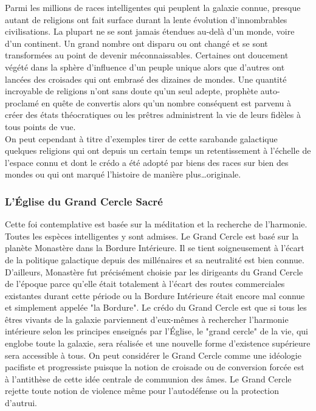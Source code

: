 \documentclass[twoside]{article}
\begin{document}
Parmi les millions de races intelligentes qui peuplent la galaxie connue, presque autant de religions ont fait surface durant la lente évolution d'innombrables civilisations. La plupart ne se sont jamais étendues au-delà d'un monde, voire d'un continent. Un grand nombre ont disparu ou ont changé et se sont transformées au point de devenir méconnaissables. Certaines ont doucement végété dans la sphère d'influence d'un peuple unique alors que d'autres ont lancées des croisades qui ont embrasé des dizaines de mondes. Une quantité incroyable de religions n'ont sans doute qu'un seul adepte, prophète auto-proclamé en quête de convertis alors qu'un nombre conséquent est parvenu à créer des états théocratiques ou les prêtres administrent la vie de leurs fidèles à tous points de vue.\\

On peut cependant à titre d'exemples tirer de cette sarabande galactique quelques religions qui ont depuis un certain temps un retentissement à l'échelle de l'espace connu et dont le crédo a été adopté par biens des races sur bien des mondes ou qui ont marqué l'histoire de manière plus\ldots originale.

\subsubsection{L'Église du Grand Cercle Sacré}
Cette foi contemplative est basée sur la méditation et la recherche de l'harmonie. Toutes les espèces intelligentes y sont admises. Le Grand Cercle est basé sur la planète Monastère dans la Bordure Intérieure. Il se tient soigneusement à l'écart de la politique galactique depuis des millénaires et sa neutralité est bien connue. D'ailleurs, Monastère fut précisément choisie par les dirigeants du Grand Cercle de l'époque parce qu'elle était totalement à l'écart des routes commerciales existantes durant cette période ou la Bordure Intérieure était encore mal connue et simplement appelée "la Bordure". Le crédo du Grand Cercle est que si tous les êtres vivants de la galaxie parviennent d'eux-mêmes à rechercher l'harmonie intérieure selon les principes enseignés par l'Église, le "grand cercle" de la vie, qui englobe toute la galaxie, sera réalisée et une nouvelle forme d'existence supérieure sera accessible à tous. On peut considérer le Grand Cercle comme une idéologie pacifiste et progressiste puisque la notion de croisade ou de conversion forcée est à l'antithèse de cette idée centrale de communion des âmes. Le Grand Cercle rejette toute notion de violence même pour l'autodéfense ou la protection d'autrui.\\
\end{document}
